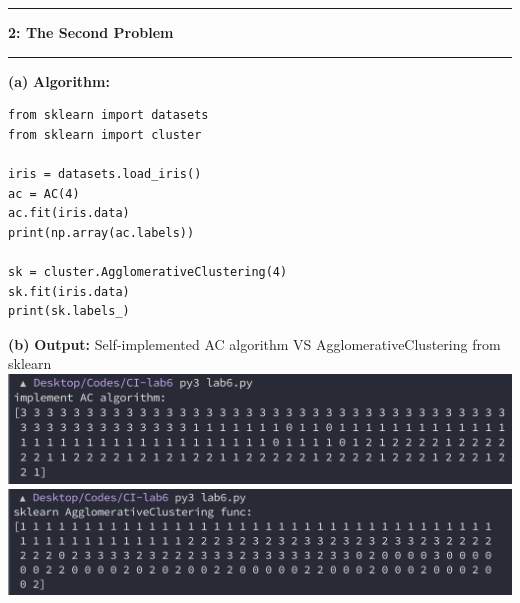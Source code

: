 \documentclass[11pt]{article}
\newcommand\question[2]{\vspace{.25in}\hrule\textbf{#1: #2}\vspace{.5em}\hrule\vspace{.10in}}
\renewcommand\part[1]{\vspace{.10in}\textbf{(#1)}}
\newcommand\algorithm{\vspace{.10in}\textbf{Algorithm: }}
\newcommand\ot{\vspace{.10in}\textbf{Output: }}
\begin{document}
\question{2}{The Second Problem}
\part{a} \algorithm
\begin{lstlisting}
from sklearn import datasets
from sklearn import cluster

iris = datasets.load_iris()
ac = AC(4)
ac.fit(iris.data)
print(np.array(ac.labels))

sk = cluster.AgglomerativeClustering(4)
sk.fit(iris.data)
print(sk.labels_)
\end{lstlisting}

\part{b} \ot Self-implemented AC algorithm VS AgglomerativeClustering from sklearn\\
\includegraphics[scale=0.8]{f1.png}
\includegraphics[scale=0.78]{f2.png}
\end{document}
